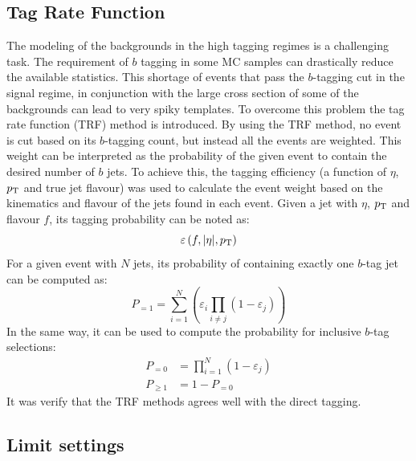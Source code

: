 \subsection{Tag Rate Function}
\label{subsec:trf}
The modeling of the backgrounds in the high tagging regimes is a challenging task. 
The requirement of $b$ tagging in some MC samples can drastically reduce the available statistics.
This shortage of events that pass the $b$-tagging cut in the signal regime, in conjunction with the large cross section of some of the backgrounds can lead to very spiky templates. 
\newline
To overcome this problem the tag rate function (TRF) method is introduced. 
By using the TRF method, no event is cut based on its $b$-tagging count, but instead all the events are weighted.
This weight can be interpreted as the probability of the given event to contain the desired number of $b$ jets. 
To achieve this, the tagging efficiency (a function of $\eta$, $p_{\text{T}}$ and true jet flavour) was
used to calculate the event weight based on the kinematics and flavour of the jets found in each event.
\newline
Given a jet with $\eta$, $p_{\text{T}}$ and flavour $f$, its tagging probability can be noted as:
\begin{equation*}
	\varepsilon \left(f,|\eta|,p_{\text{T}}\right)
\end{equation*}
\newline
For a given event with $N$ jets, its probability of containing exactly one $b$-tag jet can be computed as:
\begin{equation*}
	P_{=1} = \sum\limits_{i=1}^N \left( \varepsilon_{i} \prod\limits_{i \neq j} \left( 1 - \varepsilon_{j} \right) \right)
\end{equation*}
\newline
In the same way, it can be used to compute the probability for inclusive $b$-tag selections:
\begin{align*}
	P_{=0} &= \prod\limits_{i=1}^N \left( 1 - \varepsilon_{j} \right) \\
	P_{\geq 1} &= 1 - P_{=0}
\end{align*}
\newline
It was verify that the TRF methods agrees well with the direct tagging.


\subsection{Limit settings}
\label{subsec:limitsettings}



